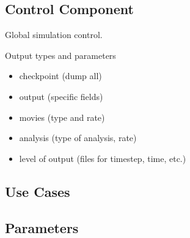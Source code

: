 \subsection{Control Component} \label{ss:component-control}


Global simulation control.

Output types and parameters

\begin{itemize}
\item checkpoint (dump all)
\item output (specific fields)
\item movies (type and rate)
\item analysis (type of analysis, rate)
\item level of output (files for timestep, time, etc.)
\end{itemize}

\subsection{Use Cases}
\subsection{Parameters}

